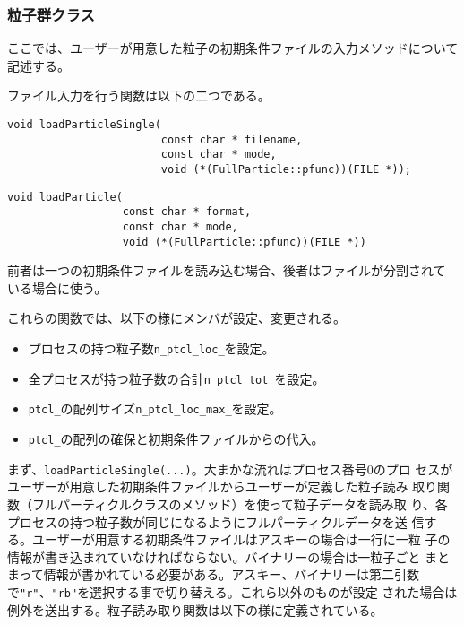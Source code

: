 \subsubsection{粒子群クラス}
\label{sec:detail_module_paricle_system}


ここでは、ユーザーが用意した粒子の初期条件ファイルの入力メソッドについて記述する。

ファイル入力を行う関数は以下の二つである。

\begin{screen}
\begin{verbatim}
void loadParticleSingle(
                        const char * filename,
                        const char * mode,
                        void (*(FullParticle::pfunc))(FILE *));
\end{verbatim}
\end{screen}

\begin{screen}
\begin{verbatim}
void loadParticle(
                  const char * format,
                  const char * mode,
                  void (*(FullParticle::pfunc))(FILE *))
\end{verbatim}
\end{screen}

前者は一つの初期条件ファイルを読み込む場合、後者はファイルが分割されて
いる場合に使う。

これらの関数では、以下の様にメンバが設定、変更される。
\begin{itemize}
\item プロセスの持つ粒子数{\tt n\_ptcl\_loc\_}を設定。
\item 全プロセスが持つ粒子数の合計{\tt n\_ptcl\_tot\_}を設定。
\item {\tt ptcl\_}の配列サイズ{\tt n\_ptcl\_loc\_max\_}を設定。
\item {\tt ptcl\_}の配列の確保と初期条件ファイルからの代入。
\end{itemize}


まず、{\tt loadParticleSingle(...)}。大まかな流れはプロセス番号0のプロ
セスがユーザーが用意した初期条件ファイルからユーザーが定義した粒子読み
取り関数（フルパーティクルクラスのメソッド）を使って粒子データを読み取
り、各プロセスの持つ粒子数が同じになるようにフルパーティクルデータを送
信する。ユーザーが用意する初期条件ファイルはアスキーの場合は一行に一粒
子の情報が書き込まれていなければならない。バイナリーの場合は一粒子ごと
まとまって情報が書かれている必要がある。アスキー、バイナリーは第二引数
で{\tt "r"}、{\tt "rb"}を選択する事で切り替える。これら以外のものが設定
された場合は例外を送出する。粒子読み取り関数は以下の様に定義されている。

